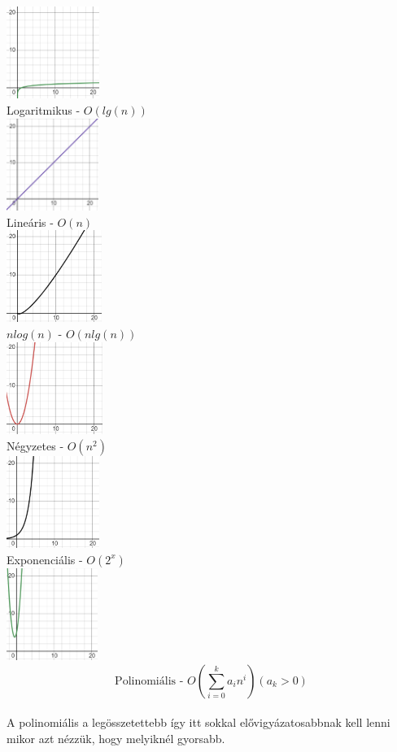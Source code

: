 \documentclass{article}
\theoremstyle{mytheoremstyle}
\theoremstyle{mytheoremstyle}
\theoremstyle{myproblemstyle}
\begin{document}
\begin{center}
    \includegraphics[height=3cm]{logx}\\Logaritmikus - $O(lg(n))$\\
    \newpage
    \includegraphics[height=3cm]{x}\\Lineáris - $O(n)$\\
    \includegraphics[height=3cm]{xlogx}\\$n log(n)$ - $O (nlg (n) )$\\
    \includegraphics[height=3cm]{xx}\\Négyzetes - $O (n^2) $\\
    \includegraphics[height=3cm]{2onx}\\Exponenciális - $O (2^x)$\\
    \includegraphics[height=3cm]{xpoli}\\\[\text{Polinomiális - }
    O(\sum_{i=0}^{k}a_i n^i)(a_k>0)\]\\
    A polinomiális a legösszetettebb így itt sokkal elővigyázatosabbnak kell lenni mikor
    azt nézzük, hogy melyiknél gyorsabb.
\end{center}
\end{document}

